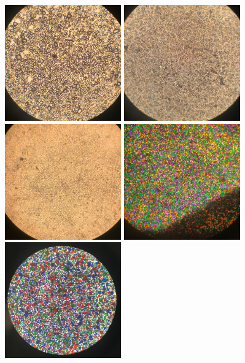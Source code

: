 \documentclass[11pt]{article}
\begin{document}
\begin{center}
\includegraphics[width=5cm, height=5cm]{img/part1_2.jpg}
\includegraphics[width=5cm, height=5cm]{img/part1_3.jpg}
\includegraphics[width=5cm, height=5cm]{img/part1_4.jpg}
\includegraphics[width=5cm, height=5cm]{img/part1_5.jpg}
\includegraphics[width=5cm, height=5cm]{img/part1_6.jpg}

\end{center}
\end{document}
